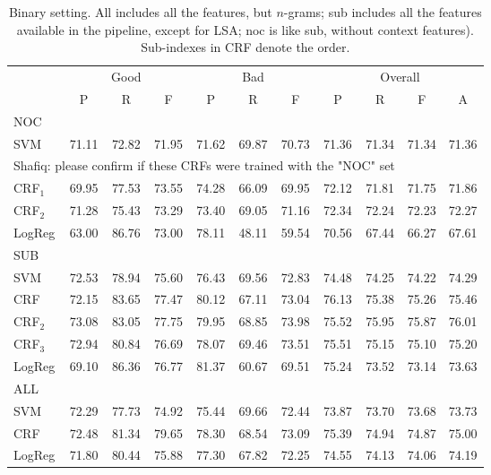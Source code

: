 \begin{table*}
\caption{Binary setting. All includes all the features, but $n$-grams; sub includes all the features available in the pipeline, except for LSA; noc is like sub, without context features).  Sub-indexes in CRF denote the order. }
\centering
\begin{tabular}{lcccccccccc}
\hline
				& \multicolumn{3}{c}{Good}	& \multicolumn{3}{c}{Bad} & \multicolumn{4}{c}{Overall}\\
				&	P			& R			& F			&	P			& R			& F			& 	P			& R			& F			& A	\\
\hline
NOC	\\
SVM			& 71.11	& 72.82	& 71.95	& 71.62	& 69.87	& 70.73	& 71.36	& 	71.34	&	71.34	& 71.36	\\
\multicolumn{9}{c}{Shafiq: please confirm if these CRFs were trained with the "NOC" set}	\\
CRF$_1$	& 69.95	& 77.53	& 73.55	& 74.28	& 66.09	& 69.95	& 72.12	& 71.81	&	71.75	& 71.86	\\				
CRF$_2$	& 71.28	& 75.43	& 	73.29	& 73.40	& 69.05	& 71.16	& 72.34	& 72.24	&	72.23	& 72.27	\\				
LogReg		& 63.00	& 86.76	& 73.00	& 78.11	& 48.11	& 59.54	& 70.56	& 67.44	&	66.27	& 67.61	\\				
\hline

SUB	\\
SVM			& 72.53 	& 	78.94	& 75.60	& 76.43	& 69.56	& 72.83	& 74.48	& 74.25	&	74.22	& 74.29	\\
CRF			& 72.15 	& 83.65	& 77.47	& 80.12	& 67.11	& 73.04	& 76.13	& 75.38	&	75.26	& 75.46	\\
CRF$_{2}$&73.08 	& 83.05	& 77.75	& 79.95	& 68.85	& 73.98	& 75.52	& 75.95	&	75.87	& 76.01	\\				
CRF$_{3}$&72.94 	& 80.84	& 76.69	& 78.07	& 69.46	& 73.51	& 75.51	& 75.15	&	75.10	& 75.20	\\
LogReg		& 69.10	& 86.36	& 76.77	& 81.37	& 60.67	& 69.51	& 75.24	& 73.52	&	73.14	& 73.63	\\
\hline

ALL	\\
SVM			& 72.29	& 	77.73	& 	74.92	& 75.44	& 69.66	& 72.44	& 73.87	& 	73.70	& 73.68	& 73.73 	\\
CRF			& 	72.48 	& 81.34	& 79.65	& 78.30	& 68.54	& 73.09	& 75.39	& 74.94	& 74.87	&	75.00 	\\
LogReg		& 71.80	& 80.44	& 75.88	& 77.30	& 67.82	& 72.25	& 74.55	& 74.13	&	74.06	& 74.19	\\


				

				
\hline
\end{tabular}
\end{table*}





